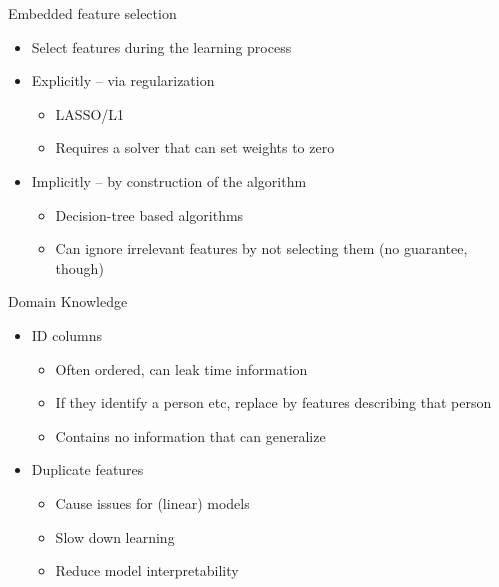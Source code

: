 \documentclass[11pt,compress,t,notes=noshow, xcolor=table]{beamer}
\begin{document}
\begin{frame}{Embedded feature selection}
    \begin{itemize}
        \item Select features during the learning process
        \item Explicitly -- via regularization
        \begin{itemize}
            \item LASSO/L1
            \item Requires a solver that can set weights to zero
        \end{itemize}
        \item Implicitly -- by construction of the algorithm
        \begin{itemize}
            \item Decision-tree based algorithms
            \item Can ignore irrelevant features by not selecting them (no guarantee, though)
        \end{itemize}
    \end{itemize}
\end{frame}

\begin{frame}{Domain Knowledge}
\begin{itemize}
    \item ID columns
    \begin{itemize}
        \item Often ordered, can leak time information
        \item If they identify a person etc, replace by features describing that person
        \item Contains no information that can generalize
    \end{itemize}
    \item Duplicate features
    \begin{itemize}
        \item Cause issues for (linear) models
        \item Slow down learning
        \item Reduce model interpretability
    \end{itemize}
\end{itemize}
\end{frame}
\end{document}
